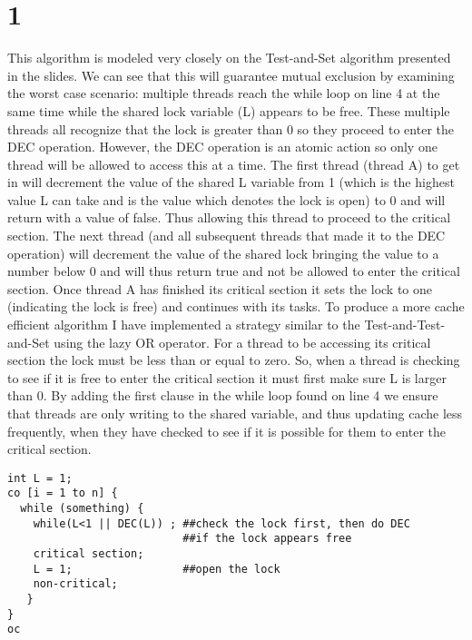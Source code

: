 \documentclass[10pt]{report}
\begin{document}
\section{1}
This algorithm is modeled very closely on the Test-and-Set algorithm
presented in the slides. We can see that this will guarantee mutual
exclusion by examining the worst case scenario: multiple threads reach
the while loop on line 4 at the same time while the shared lock
variable (L) appears to be free. These multiple threads all
recognize that the lock is greater than 0 so they proceed to enter
the DEC operation. However, the DEC operation is an atomic action so
only one thread will be allowed to access this at a time. The first
thread (thread A) to get in will decrement the value of the shared L variable
from 1 (which is the highest value L can take and is the value which
denotes the lock is open) to 0 and will return with a value of false. Thus
allowing this thread to proceed to the critical section. The next
thread (and all subsequent threads that made it to the DEC operation)
will decrement the value of the shared lock bringing the value to a
number below 0 and will thus return true and not be allowed to enter
the critical section. Once thread A has finished its critical section
it sets the lock to one (indicating the lock is free) and continues
with its tasks. To produce a more cache efficient algorithm I have
implemented a strategy similar to the Test-and-Test-and-Set using the
lazy OR operator. For a thread to be accessing its critical section
the lock must be less than or equal to zero. So, when a thread is
checking to see if it is free to enter the critical section it must
first make sure L is larger than 0. By adding the first clause in the
while loop found on line 4 we ensure that threads are only writing to
the shared variable, and thus updating cache less frequently, when
they have checked to see if it is possible for them to enter the
critical section.
\begin{lstlisting}[caption={Pseudo code solution for critical section problem
    using the DEC operation.},label={fig:code0}]
int L = 1;
co [i = 1 to n] {
  while (something) {
    while(L<1 || DEC(L)) ; ##check the lock first, then do DEC
                           ##if the lock appears free
    critical section;
    L = 1;                 ##open the lock
    non-critical;
   }
}
oc
\end{lstlisting}
\newpage
\end{document}
